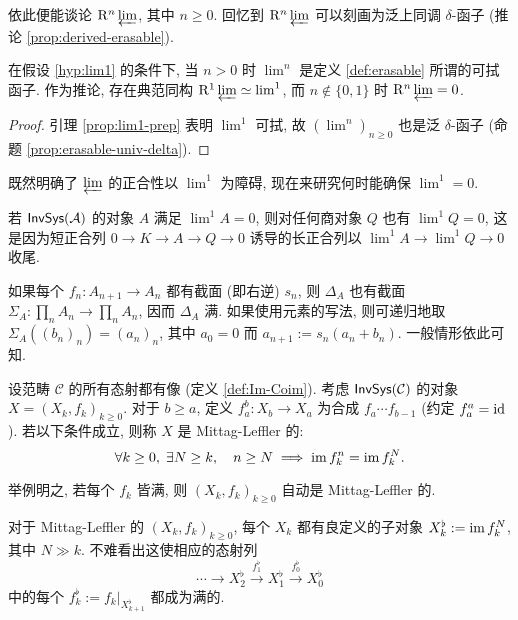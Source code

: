 依此便能谈论 $\mathrm{R}^n \varprojlim$, 其中 $n \geq 0$. 回忆到 $\mathrm{R}^n \varprojlim$ 可以刻画为泛上同调 $\delta$-函子 (推论 \ref{prop:derived-erasable}).

\begin{theorem}[S.\ Eilenberg]\label{prop:lim1}
	在假设 \ref{hyp:lim1} 的条件下, 当 $n > 0$ 时 $\lim\nolimits^n$ 是定义 \ref{def:erasable} 所谓的可拭函子. 作为推论, 存在典范同构 $\mathrm{R}^1 \varprojlim \simeq \lim^1$, 而 $n \notin \{0, 1\}$ 时 $\mathrm{R}^n \varprojlim = 0$.
\end{theorem}
\begin{proof}
	引理 \ref{prop:lim1-prep} 表明 $\lim^1$ 可拭, 故 $(\lim^n)_{n \geq 0}$ 也是泛 $\delta$-函子 (命题 \ref{prop:erasable-univ-delta}).
\end{proof}

既然明确了 $\varprojlim$ 的正合性以 $\lim^1$ 为障碍, 现在来研究何时能确保 $\lim^1 = 0$.

\begin{example}\label{eg:quotient-lim1-0}
	若 $\mathsf{InvSys}(\mathcal{A})$ 的对象 $A$ 满足 $\lim^1 A = 0$, 则对任何商对象 $Q$ 也有 $\lim^1 Q = 0$, 这是因为短正合列 $0 \to K \to A \to Q \to 0$ 诱导的长正合列以 $\lim^1 A \to \lim^1 Q \to 0$ 收尾.
\end{example}

\begin{example}\label{eg:lim1-section}
	如果每个 $f_n: A_{n+1} \to A_n$ 都有截面 (即右逆) $s_n$, 则 $\Delta_A$ 也有截面 $\Sigma_A: \prod_n A_n \to \prod_n A_n$, 因而 $\Delta_A$ 满. 如果使用元素的写法, 则可递归地取 $\Sigma_A((b_n)_n) = (a_n)_n$, 其中 $a_0 = 0$ 而 $a_{n+1} := s_n\left( a_n + b_n \right)$. 一般情形依此可知.
\end{example}

\begin{definition}\label{def:ML}
	设范畴 $\mathcal{C}$ 的所有态射都有像 (定义 \ref{def:Im-Coim}). 考虑 $\mathsf{InvSys}(\mathcal{C})$ 的对象 $X = (X_k, f_k)_{k \geq 0}$. 对于 $b \geq a$, 定义 $f^b_a: X_b \to X_a$ 为合成 $f_a \cdots f_{b-1}$ (约定 $f^a_a = \mathrm{id}$). 若以下条件成立, 则称 $X$ 是 Mittag-Leffler 的:
	\[ \forall k \geq 0, \; \exists N \geq k, \quad n \geq N \implies \operatorname{im} f^n_k = \operatorname{im} f^N_k. \]
\end{definition}

举例明之, 若每个 $f_k$ 皆满, 则 $(X_k, f_k)_{k \geq 0}$ 自动是 Mittag-Leffler 的.

对于 Mittag-Leffler 的 $(X_k, f_k)_{k \geq 0}$, 每个 $X_k$ 都有良定义的子对象 $X_k^\flat := \operatorname{im} f^N_k$, 其中 $N \gg k$. 不难看出这使相应的态射列
\[ \cdots \to X^\flat_2 \xrightarrow{f^\flat_1} X^\flat_1 \xrightarrow{f^\flat_0} X^\flat_0 \]
中的每个 $f^\flat_k := f_k|_{X^\flat_{k+1}}$ 都成为满的.

